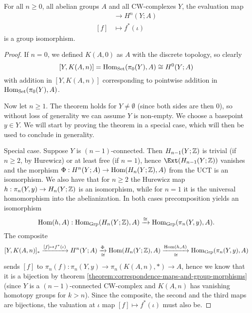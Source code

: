 \begin{theorem}
For all $n\ge0$, all abelian groups $A$ and all CW-complexes $Y$, the evaluation map
\begin{align*}
    [Y,K(A,n)]&\to H^n(Y;A)\\
    [f]&\mapsto f^*(\iota)
\end{align*}
is a group isomorphism.
\end{theorem}

\begin{proof}\renewcommand{\qedsymbol}{\textit{To be continued...}}
If $n=0$, we defined $K(A,0)$ as $A$ with the discrete topology, so clearly
\[[Y,K(A,n)]=\operatorname{Hom}_{\mathrm{Set}}(\pi_0(Y),A)\cong H^0(Y;A)\]
with addition in $[Y,K(A,n)]$ corresponding to pointwise addition in $\operatorname{Hom}_{\mathrm{Set}}(\pi_0(Y),A)$.

Now let $n\ge1$. The theorem holds for $Y\ne\emptyset$ (since both sides are then $0$), so without loss of generality we can assume $Y$ is non-empty. We choose a basepoint $y\in Y$. We will start by proving the theorem in a special case, which will then be used to conclude in generality.

Special case. Suppose $Y$ is $(n-1)$-connected. Then $H_{n-1}(Y;{\mathbb Z})$ is trivial (if $n\ge2$, by Hurewicz) or at least free (if $n=1$), hence $\Ext(H_\ni(Y;\Z))$ vanishes and the morphism $\Phi:H^n(Y;A)\to\operatorname{Hom}(H_n(Y;{\mathbb Z}),A)$ from the UCT is an isomorphism. We also have that for $n\ge2$ the Hurewicz map $h:\pi_n(Y,y)\to H_n(Y;{\mathbb Z})$ is an isomorphism, while for $n=1$ it is the universal homomorphism into the abelianization. In both cases precomposition yields an isomorphism
\[\operatorname{Hom}(h,A):\operatorname{Hom}_{\mathrm{Grp}}(H_n(Y;{\mathbb Z}),A)\xrightarrow{\cong}\operatorname{Hom}_{\mathrm{Grp}}(\pi_n(Y,y),A).\]
The composite
\[[Y,K(A,n)]_*\xrightarrow{[f]\mapsto f^*(\iota)} H^n(Y;A)\underset{\cong}{\xrightarrow{\Phi}}\operatorname{Hom}(H_n(Y;{\mathbb Z}),A)\underset{\cong}{\xrightarrow{\operatorname{Hom}(h,A)}}\operatorname{Hom}_{\mathrm{Grp}}(\pi_n(Y,y),A)\]
sends $[f]$ to $\pi_n(f):\pi_n(Y,y)\to\pi_n(K(A,n),*)\to A$, hence we know that it is a bijection by theorem \ref{theorem:correspondence-maps-and-group-morphisms} (since $Y$ is a $(n-1)$-connected CW-complex and $K(A,n)$ has vanishing homotopy groups for $k>n$). Since the composite, the second and the third maps are bijections, the valuation at $\iota$ map $[f]\mapsto f^*(\iota)$ must also be.
\end{proof}
